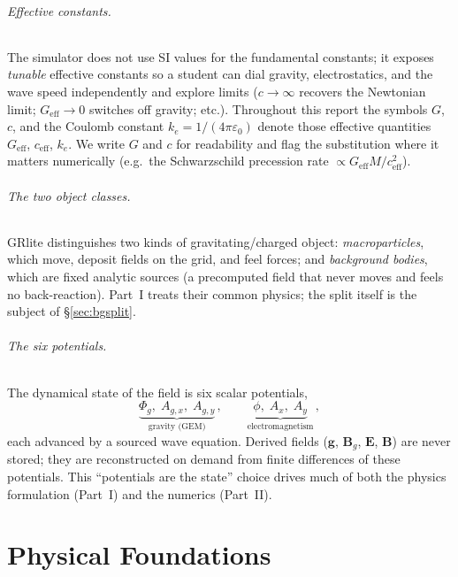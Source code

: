 \documentclass[11pt]{article}
\newcommand{\Phig}{\Phi_g}                 %
\newcommand{\vv}[1]{\mathbf{#1}}           %
\newcommand{\Geff}{G_{\mathrm{eff}}}
\newcommand{\keff}{k_e}
\newcommand{\ceff}{c}                       %
\newcommand{\Bg}{\vv{B}_g}
\begin{document}
\paragraph{Effective constants.}
The simulator does not use SI values for the fundamental constants; it exposes
\emph{tunable} effective constants so a student can dial gravity, electrostatics,
and the wave speed independently and explore limits ($\ceff\to\infty$ recovers
the Newtonian limit; $\Geff\to 0$ switches off gravity; etc.).  Throughout this
report the symbols $G$, $c$, and the Coulomb constant $\keff = 1/(4\pi
\varepsilon_0)$ denote those effective quantities $\Geff$, $c_{\mathrm{eff}}$,
$\keff$.  We write $G$ and $c$ for readability and flag the substitution where
it matters numerically (e.g.\ the Schwarzschild precession rate
$\propto \Geff M / c_{\mathrm{eff}}^2$).

\paragraph{The two object classes.}
GRlite distinguishes two kinds of gravitating/charged object:
\emph{macroparticles}, which move, deposit fields on the grid, and feel forces;
and \emph{background bodies}, which are fixed analytic sources (a precomputed
field that never moves and feels no back-reaction).  Part~I treats their common
physics; the split itself is the subject of \S\ref{sec:bgsplit}.

\paragraph{The six potentials.}
The dynamical state of the field is six scalar potentials,
\begin{equation}
  \underbrace{\Phig,\; A_{g,x},\; A_{g,y}}_{\text{gravity (GEM)}}\,,\qquad
  \underbrace{\phi,\; A_x,\; A_y}_{\text{electromagnetism}}\,,
\end{equation}
each advanced by a sourced wave equation.  Derived fields ($\vv{g}$, $\Bg$,
$\vv{E}$, $\vv{B}$) are never stored; they are reconstructed on demand from
finite differences of these potentials.  This ``potentials are the state''
choice drives much of both the physics formulation (Part~I) and the numerics
(Part~II).

\part{Physical Foundations}

\end{document}
